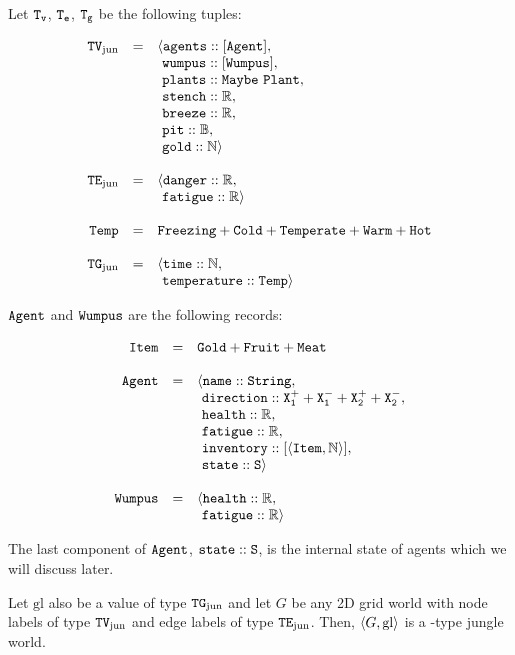 \begin{definition}[\wjun]
\label{def:wjun}
Let $\mathtt{T_v}$, $\mathtt{T_e}$, $\mathtt{T_g}$ be the following tuples:

$$
	\begin{array}{r c l}
		\type{TV_{\mathrm{jun}}} & = & \langle \field{agents} :: [\type{Agent}],\\
		           &   &       \ \field{wumpus} :: [\type{Wumpus}],\\
		           &   & 	   \ \field{plants} :: \type{Maybe\ Plant},\\
		           &   &       \ \field{stench} :: \R,\\
		           &   &       \ \field{breeze} :: \R,\\
		           &   &	   \ \field{pit}    :: \B,\\
		           &   &	   \ \field{gold}   :: \N \rangle 
		\\
		\\
		\type{TE_{\mathrm{jun}}} & = & \langle \field{danger} :: \R,\\
				   &   &       \ \field{fatigue} :: \R \rangle
		\\
		\\
		\type{Temp} & = & \type{Freezing} + \type{Cold} + \type{Temperate} + \type{Warm} + \type{Hot}\\
		\\
		\type{TG_{\mathrm{jun}}} & = & \langle \field{time} :: \N,\\
				   &   &       \ \field{temperature} :: \type{Temp} \rangle
	\end{array}
$$

$\mathtt{Agent}$ and $\mathtt{Wumpus}$ are the following records:

$$
	\begin{array}{r c l}
		\mathtt{Item} & = & \mathtt{Gold + Fruit + Meat}\\
		\\
		\mathtt{Agent} & = & \langle \mathtt{name} :: \mathtt{String},\\ 
					 &   & \ \mathtt{direction} :: \mathtt{X_1^+ + X_1^- + X_2^+ + X_2^-},\\
					 &   & \ \mathtt{health} :: \mathbb{R},\\
					 &   & \ \mathtt{fatigue} :: \mathbb{R},\\
					 &   & \ \mathtt{inventory} :: [\mathtt{\langle Item, \mathbb{N} \rangle}],\\
					 &   & \ \mathtt{state} :: \mathtt{S} \rangle
		\\
		\\
		\mathtt{Wumpus} & = & \langle \mathtt{health} :: \mathbb{R},\\
					  &   & \ \mathtt{fatigue} :: \mathbb{R}\rangle
	\end{array}
$$

The last component of $\mathtt{Agent}$, $\mathtt{state} :: \mathtt{S}$, is the internal state of agents which we will discuss later.

Let $\mathrm{gl}$ also be a value of type $\mathtt{TG}_{\mathrm{jun}}$ and let $G$ be any 2D grid world with node labels of type $\mathtt{TV}_{\mathrm{jun}}$ and edge labels of type $\mathtt{TE}_{\mathrm{jun}}$. Then, $\langle G, \mathrm{gl} \rangle$ is a \wjun-type jungle world.
\end{definition}

